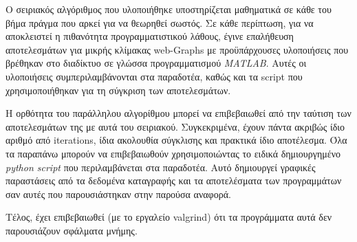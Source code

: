 Ο σειριακός αλγόριθμος που υλοποιήθηκε υποστηρίζεται μαθηματικά σε κάθε του βήμα πράγμα που αρκεί για να θεωρηθεί σωστός. Σε κάθε περίπτωση, για να αποκλειστεί η πιθανότητα προγραμματιστικού λάθους, έγινε επαλήθευση αποτελεσμάτων για μικρής κλίμακας web-Graphs με προϋπάρχουσες υλοποιήσεις που βρέθηκαν στο διαδίκτυο σε γλώσσα προγραμματισμού \textit{MATLAB}. Αυτές οι υλοποιήσεις συμπεριλαμβάνονται στα παραδοτέα, καθώς και τα script που χρησιμοποιήθηκαν για τη σύγκριση των αποτελεσμάτων.

Η ορθότητα του παράλληλου αλγορίθμου μπορεί να επιβεβαιωθεί από την ταύτιση των αποτελεσμάτων της με αυτά του σειριακού. Συγκεκριμένα, έχουν πάντα ακριβώς ίδιο αριθμό από iterations, ίδια ακολουθία σύγκλισης και πρακτικά ίδιο αποτέλεσμα. Όλα τα παραπάνω μπορούν να επιβεβαιωθούν χρησιμοποιώντας το ειδικά δημιουργημένο \textit{python script} που περιλαμβάνεται στα παραδοτέα. Αυτό δημιουργεί γραφικές παραστάσεις από τα δεδομένα καταγραφής και τα αποτελέσματα των προγραμμάτων σαν αυτές που παρουσιάστηκαν στην παρούσα αναφορά.

Τέλος, έχει επιβεβαιωθεί (με το εργαλείο valgrind) ότι τα προγράμματα αυτά δεν παρουσιάζουν σφάλματα μνήμης.